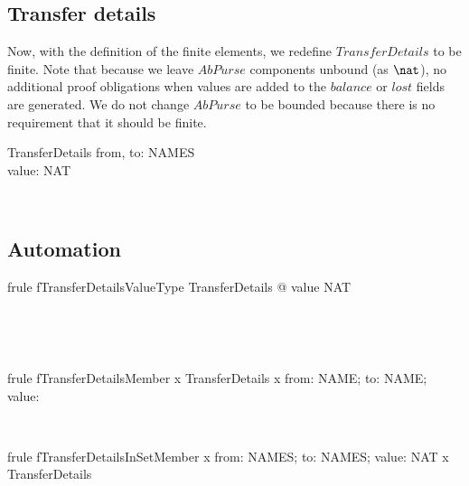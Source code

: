\subsection{Transfer details}\label{ch3.transferdetails}

Now, with the definition of the finite elements, we redefine
$TransferDetails$ to be finite. Note that because we leave
$AbPurse$ components unbound (as $\nat$), no additional proof
obligations when values are added to the $balance$ or $lost$ fields
are generated. We do not change $AbPurse$ to be bounded because
there is no requirement that it should be finite.
%
\begin{LSDef}
\begin{schema}{TransferDetails}
   from, to: NAMES\\
   value: NAT
\end{schema}~\end{LSDef}

\subsection*{Automation}

\begin{LFRT}
\begin{theorem}{frule fTransferDetailsValueType}
    \forall TransferDetails @ value \in NAT
\end{theorem}~\end{LFRT}

\begin{LFRT}
~\end{LFRT}

\begin{LFRT}
\begin{theorem}{frule fTransferDetailsMember}
    x \in  TransferDetails \implies  x \in  \lblot from: NAME; to: NAME; value: \nat \rblot
\end{theorem}~\end{LFRT}

\begin{LFRT}
\begin{theorem}{frule fTransferDetailsInSetMember}
    x \in  \lblot from: NAMES; to: NAMES; value: NAT \rblot \implies  x \in  TransferDetails
\end{theorem}~\end{LFRT}

